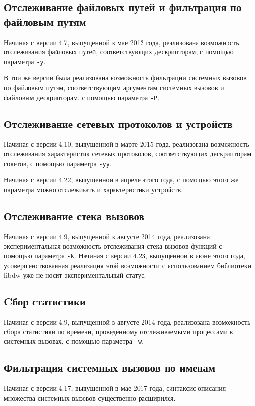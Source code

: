 \documentclass[10pt, a5paper]{article}
\begin{document}
\subsection*{Отслеживание файловых путей и фильтрация по файловым путям}

Начиная с версии 4.7, выпущенной в мае 2012 года, реализована возможность отслеживания файловых путей, соответствующих дескрипторам, с помощью параметра \texttt{-y}.

В той же версии была реализована возможность фильтрации системных вызовов по файловым путям, соответствующим аргументам системных вызовов и файловым дескрипторам, с помощью параметра \texttt{-P}.

\subsection*{Отслеживание сетевых протоколов и устройств}

Начиная с версии 4.10, выпущенной в марте 2015 года, реализована возможность отслеживания характеристик сетевых протоколов, соответствующих дескрипторам сокетов, с помощью параметра \texttt{-yy}.

Начиная с версии 4.22, выпущенной в апреле этого года, с помощью этого же параметра можно отслеживать и характеристики устройств.

\subsection*{Отслеживание стека вызовов}

Начиная с версии 4.9, выпущенной в августе 2014 года, реализована экспериментальная возможность отслеживания стека вызовов функций с помощью параметра \texttt{-k}. Начиная с версии 4.23, выпущенной в июне этого года, усовершенствованная реализация этой возможности с использованием библиотеки libdw уже не носит экспериментальный статус.

\subsection*{Cбор статистики} 
Начиная с версии 4.9, выпущенной в августе 2014 года, реализована возможность сбора статистики по времени, проведённому отслеживаемыми процессами в системных вызовах, с помощью параметра \texttt{-w}.

\subsection*{Фильтрация системных вызовов по именам} 
Начиная с версии 4.17, выпущенной в мае 2017 года, синтаксис описания множества системных вызовов существенно расширился.
\end{document}
